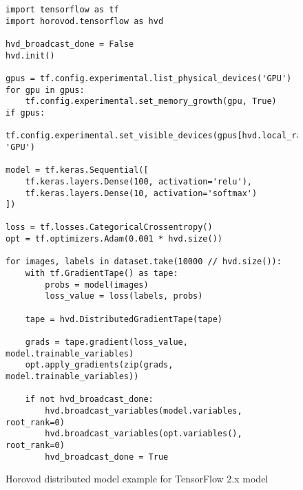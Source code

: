 \begin{figure}[ht!]
  \begin{lstlisting}[style=mpython]
import tensorflow as tf
import horovod.tensorflow as hvd

hvd_broadcast_done = False
hvd.init()

gpus = tf.config.experimental.list_physical_devices('GPU')
for gpu in gpus:
    tf.config.experimental.set_memory_growth(gpu, True)
if gpus:
    tf.config.experimental.set_visible_devices(gpus[hvd.local_rank()], 'GPU')

model = tf.keras.Sequential([
    tf.keras.layers.Dense(100, activation='relu'),
    tf.keras.layers.Dense(10, activation='softmax')
])

loss = tf.losses.CategoricalCrossentropy()
opt = tf.optimizers.Adam(0.001 * hvd.size())

for images, labels in dataset.take(10000 // hvd.size()):
    with tf.GradientTape() as tape:
        probs = model(images)
        loss_value = loss(labels, probs)    

    tape = hvd.DistributedGradientTape(tape)

    grads = tape.gradient(loss_value, model.trainable_variables)
    opt.apply_gradients(zip(grads, model.trainable_variables))

    if not hvd_broadcast_done:
        hvd.broadcast_variables(model.variables, root_rank=0)
        hvd.broadcast_variables(opt.variables(), root_rank=0)
        hvd_broadcast_done = True  \end{lstlisting}
  \caption{Horovod distributed model example for TensorFlow 2.x model}
\label{fig:back:hvd2} 
\end{figure}

